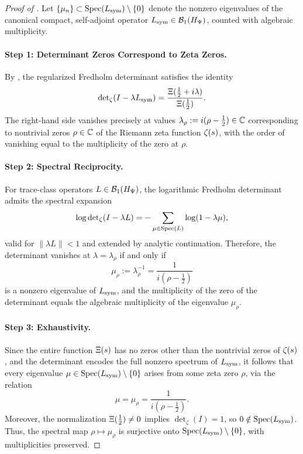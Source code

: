 \begin{proof}[Proof of ]
Let \( \{ \mu_n \} \subset \operatorname{Spec}(L_{\mathrm{sym}}) \setminus \{0\} \) denote the nonzero eigenvalues of the canonical compact, self-adjoint operator \( L_{\mathrm{sym}} \in \mathcal{B}_1(H_{\Psi}) \), counted with algebraic multiplicity.

\paragraph{Step 1: Determinant Zeros Correspond to Zeta Zeros.}
By , the regularized Fredholm determinant satisfies the identity
\[
\det\nolimits_\zeta(I - \lambda L_{\mathrm{sym}}) = \frac{\Xi(\tfrac{1}{2} + i\lambda)}{\Xi(\tfrac{1}{2})}.
\]
The right-hand side vanishes precisely at values \( \lambda_\rho := i(\rho - \tfrac{1}{2}) \in \mathbb{C} \) corresponding to nontrivial zeros \( \rho \in \mathbb{C} \) of the Riemann zeta function \( \zeta(s) \), with the order of vanishing equal to the multiplicity of the zero at \( \rho \).

\paragraph{Step 2: Spectral Reciprocity.}
For trace-class operators \( L \in \mathcal{B}_1(H_{\Psi}) \), the logarithmic Fredholm determinant admits the spectral expansion
\[
\log \det\nolimits_\zeta(I - \lambda L) = -\sum_{\mu \in \operatorname{Spec}(L)} \log(1 - \lambda \mu),
\]
valid for \( \|\lambda L\| < 1 \) and extended by analytic continuation. Therefore, the determinant vanishes at \( \lambda = \lambda_\rho \) if and only if
\[
\mu_\rho := \lambda_\rho^{-1} = \frac{1}{i(\rho - \tfrac{1}{2})}
\]
is a nonzero eigenvalue of \( L_{\mathrm{sym}} \), and the multiplicity of the zero of the determinant equals the algebraic multiplicity of the eigenvalue \( \mu_\rho \).

\paragraph{Step 3: Exhaustivity.}
Since the entire function \( \Xi(s) \) has no zeros other than the nontrivial zeros of \( \zeta(s) \), and the determinant encodes the full nonzero spectrum of \( L_{\mathrm{sym}} \), it follows that every eigenvalue \( \mu \in \operatorname{Spec}(L_{\mathrm{sym}}) \setminus \{0\} \) arises from some zeta zero \( \rho \), via the relation
\[
\mu = \mu_\rho = \frac{1}{i(\rho - \tfrac{1}{2})}.
\]
Moreover, the normalization \(\Xi(\tfrac{1}{2}) \ne 0\) implies \(\det\nolimits_\zeta(I) = 1\), so \( 0 \notin \operatorname{Spec}(L_{\mathrm{sym}}) \). Thus, the spectral map \( \rho \mapsto \mu_\rho \) is surjective onto \( \operatorname{Spec}(L_{\mathrm{sym}}) \setminus \{0\} \), with multiplicities preserved.
\end{proof}
